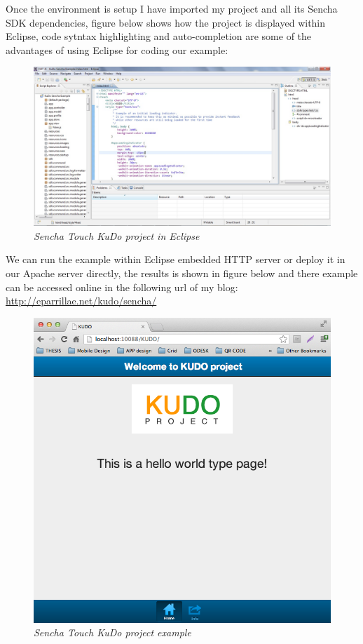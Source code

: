 \documentclass[a4paper,12pt]{book}
\begin{document}
Once the environment is setup I have imported my project and all its Sencha SDK dependencies, figure below shows how the project is displayed within Eclipse, code sytntax highlighting and auto-completion are some of the advantages of using Eclipse for coding our example:

\begin{figure}[H]
    \centering
    \includegraphics[width=12cm, keepaspectratio]{img/sencha3.png}
    \caption{\textit{Sencha Touch KuDo project in Eclipse}}
 \end{figure}
 
We can run the example within Eclipse embedded HTTP server or deploy it in our Apache server directly, the results is shown in figure below and there example can be accessed online in the following url of my blog:\\ 

\url{http://eparrillae.net/kudo/sencha/}

\begin{figure}[H]
    \centering
    \includegraphics[width=12cm, keepaspectratio]{img/sencha4.png}
    \caption{\textit{Sencha Touch KuDo project example}}
 \end{figure}
\end{document}
